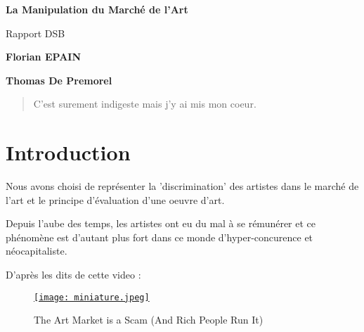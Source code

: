 \documentclass{article}
\begin{document}
\begin{titlepage}
   \begin{center}
       \vspace*{1cm}
       \Huge
       \textbf{La Manipulation du Marché de l'Art}

       \vspace{0.5cm}
       \LARGE
        Rapport DSB
        
            
       \vspace{1.5cm}

       \textbf{Florian EPAIN}
       
       
       \textbf{Thomas De Premorel}
       
       
       \vspace{0.5cm}

   \end{center}
   
   \vspace{13cm}
    \begin{abstract}
        C'est surement indigeste mais j'y ai mis mon coeur.
    \end{abstract}
\end{titlepage}



\tableofcontents
\clearpage
\section{Introduction}

Nous avons choisi de représenter la 'discrimination' des artistes dans le marché de l'art et le principe d'évaluation d'une oeuvre d'art.

Depuis l'aube des temps, les artistes ont eu du mal à se rémunérer et ce phénomène est d'autant plus fort dans ce monde d'hyper-concurence et néocapitaliste.

D'après les dits de cette video : 
\begin{figure}[htp]
    \centering
    \href{https://www.youtube.com/watch?v=ZZ3F3zWiEmc}
    {\texttt{[image: miniature.jpeg]}}
    \caption{\label{fig:miniature}The Art Market is a Scam (And Rich People Run It)}
\end{figure}
\end{document}
